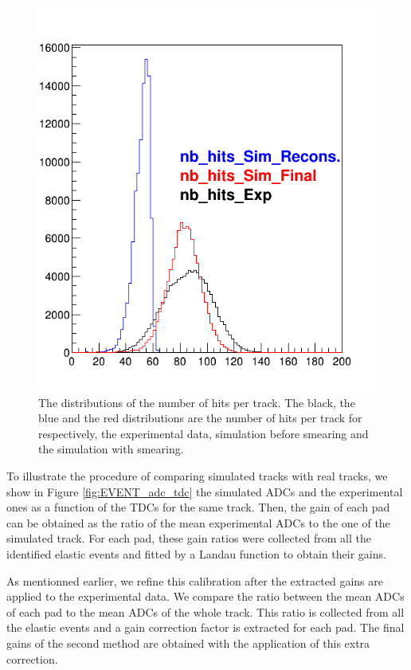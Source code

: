\begin{figure}[tp]
\centering
\includegraphics[scale=0.40]{fig_rtpc/NNb_hits.png}
\caption{The distributions of the number of hits per track. The black, the blue and the red distributions are the number of hits per track  for respectively, the experimental data, simulation before smearing and the simulation with smearing.}
\label{fig:NNb_hits}
\end{figure}

To illustrate the procedure of comparing simulated tracks with real tracks,
we show in Figure \ref{fig:EVENT_adc_tdc} the simulated ADCs and the 
experimental ones as a function of the TDCs for the same track. 
Then, the gain of each pad can be obtained as the ratio of the mean experimental 
ADCs to the one of the simulated track. For each pad, these gain 
ratios were collected from all the identified elastic events and fitted by a 
Landau function to obtain their gains.

As mentionned earlier, we refine this calibration after 
the extracted gains are applied to the experimental data. We compare the ratio between the 
mean ADCs of each pad to the mean ADCs of the whole track. This ratio is 
collected from all the elastic events and a gain correction factor is extracted 
for each pad. The final gains of the second method are obtained with the application of 
this extra correction.\\

